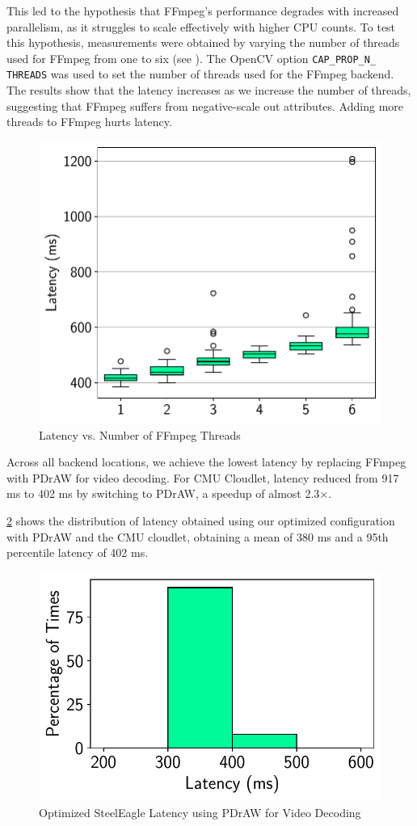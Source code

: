 This led to the hypothesis that FFmpeg's performance degrades with increased
parallelism, as it struggles to scale effectively with higher CPU counts.  To
test this hypothesis, measurements were obtained by varying the number of
threads used for FFmpeg from one to six (see ).  The
OpenCV option \texttt{CAP\_\allowbreak PROP\_\allowbreak N\_\allowbreak
THREADS} was used to set the number of threads used for the FFmpeg backend.
The results show that the latency increases as we increase the number of threads,
suggesting that FFmpeg suffers from negative-scale out attributes. Adding more
threads to FFmpeg hurts latency.

\begin{figure}[htbp]
\centerline{\includegraphics[width = .4\textwidth]{figs/threads_box_plot.pdf}}
\caption{Latency vs. Number of FFmpeg Threads}
\label{fig:threads_box_plot}
\end{figure}

Across all backend locations, we achieve the lowest latency by replacing FFmpeg
with PDrAW for video decoding.  For CMU Cloudlet, latency reduced
from 917 ms to 402 ms by switching to PDrAW, a speedup of almost 2.3$\times$.

\cref{fig:steeleagle_optimized_latency} shows the distribution of latency
obtained using our optimized configuration with PDrAW and the CMU cloudlet,
obtaining a mean of 380 ms and a 95th percentile latency of 402 ms.

\begin{figure}[htbp]
\centerline{\includegraphics[width = .4\textwidth]{figs/pdraw_latency.pdf}}
\caption{Optimized SteelEagle Latency using PDrAW for Video Decoding}
\label{fig:steeleagle_optimized_latency}
\end{figure}

